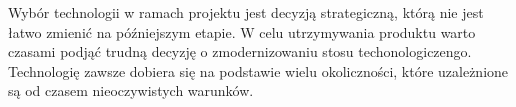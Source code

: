 Wybór technologii w ramach projektu jest decyzją strategiczną, którą nie jest łatwo zmienić na późniejszym etapie.
W celu utrzymywania produktu warto czasami podjąć trudną decyzję o zmodernizowaniu stosu techonologiczengo.
Technologię zawsze dobiera się na podstawie wielu okoliczności, które uzależnione są od czasem nieoczywistych warunków.